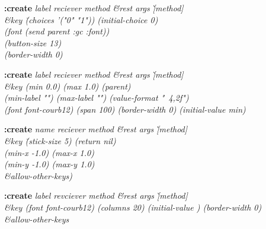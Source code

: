 {\newpage
\clearpage
\samepage 
\begin{emtabbing}{\bf :create} 
\it label reciever method \= \&rest args
\` [method]\\  
           \>\&key \=(choices '("0" "1")) (initial-choice 0)\\  
\>\> (font (send parent :gc :font))\\  
                \>\>(button-size 13)\\  
                \>\>(border-width 0)\\  
  
\rm
\end{emtabbing}
}

{\newpage
\clearpage
\samepage 
\begin{emtabbing}{\bf :create} 
\it label reciever method \= \&rest args
\` [method]\\  
\>\&key (min 0.0) (max 1.0) (parent)\\  
\>(min-label "") (max-label "") (value-format "~4,2f")\\  
\>(font font-courb12) (span 100) (border-width 0) (initial-value min)  
\rm
\end{emtabbing}
}

{\newpage
\clearpage
\samepage 
\begin{emtabbing}{\bf :create} 
\it name reciever method \= \&rest args
\` [method]\\  
           \>\&key \=(stick-size 5) (return nil)\\  
                \>\>(min-x -1.0) (max-x 1.0)\\  
                \>\>(min-y -1.0) (max-y 1.0)\\  
           \>\&allow-other-keys) 
  
\rm
\end{emtabbing}
}

{\newpage
\clearpage
\samepage 
\begin{figure}\begin{center}
\end{center}

\end{figure}
}

{\newpage
\clearpage
\samepage 
\begin{emtabbing}{\bf :create} 
\it label revciever method \= \&rest args \` [method]\\  
\>\&key (font font-courb12) (columns 20) (initial-value ) (border-width 0)\\  
\>\&allow-other-keys
\rm
\end{emtabbing}
}

